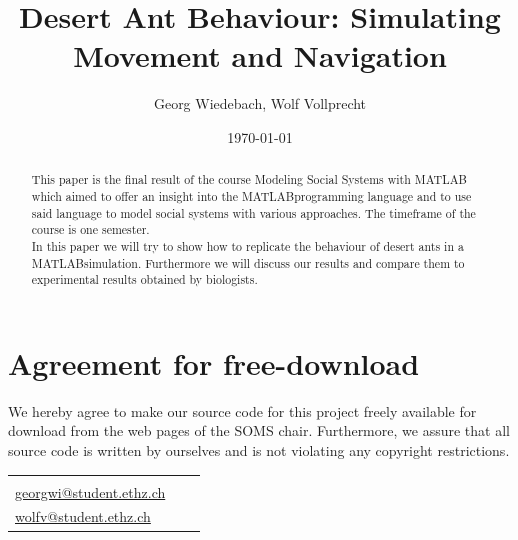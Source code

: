 \documentclass[11pt]{article}
\title{Desert Ant Behaviour: Simulating Movement and Navigation}
\author{Georg Wiedebach, Wolf Vollprecht}
\date{\today}
\begin{document}

\newpage


\newpage
\section*{Agreement for free-download}
\bigskip


\bigskip


\large We hereby agree to make our source code for this project freely available for download from the web pages of the SOMS chair. Furthermore, we assure that all source code is written by ourselves and is not violating any copyright restrictions.

\begin{center}

\bigskip


\bigskip


\begin{tabular}{@{}p{3.3cm}@{}p{6cm}@{}@{}p{6cm}@{}}
\begin{minipage}{3cm}

\end{minipage}
&
\begin{minipage}{6cm}
\large Georg Wiedebach\\
\href{mailto:georgwi@student.ethz.ch}{georgwi@student.ethz.ch}
\end{minipage}
&
\begin{minipage}{6cm}

\large Wolf Vollprecht\\
\href{mailto:wolfv@student.ethz.ch}{wolfv@student.ethz.ch}

\end{minipage}
\end{tabular}


\end{center}
\newpage





\begin{abstract}
This paper is the final result of the course {\sc Modeling Social Systems with MATLAB\texttrademark} which aimed to offer an insight into the MATLAB\texttrademark programming language and to use said language to model social systems with various approaches. The timeframe of the course is one semester. \\
In this paper we will try to show how to replicate the behaviour of desert ants in a MATLAB\texttrademark simulation. Furthermore we will discuss our results and compare them to experimental results obtained by biologists.
\end{abstract}
\end{document}
